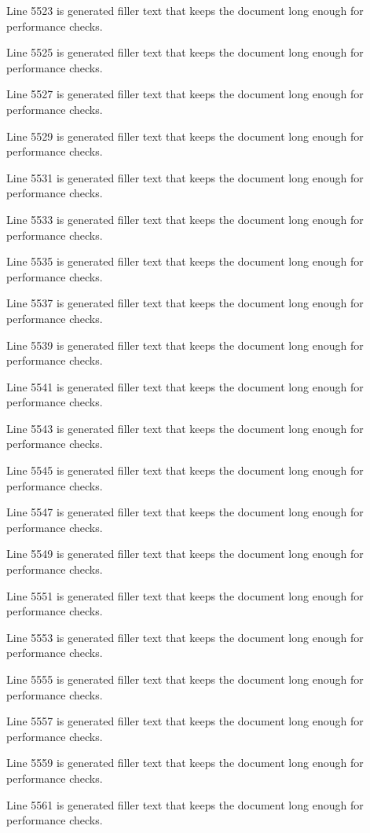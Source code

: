 Line 5523 is generated filler text that keeps the document long enough for performance checks.

Line 5525 is generated filler text that keeps the document long enough for performance checks.

Line 5527 is generated filler text that keeps the document long enough for performance checks.

Line 5529 is generated filler text that keeps the document long enough for performance checks.

Line 5531 is generated filler text that keeps the document long enough for performance checks.

Line 5533 is generated filler text that keeps the document long enough for performance checks.

Line 5535 is generated filler text that keeps the document long enough for performance checks.

Line 5537 is generated filler text that keeps the document long enough for performance checks.

Line 5539 is generated filler text that keeps the document long enough for performance checks.

Line 5541 is generated filler text that keeps the document long enough for performance checks.

Line 5543 is generated filler text that keeps the document long enough for performance checks.

Line 5545 is generated filler text that keeps the document long enough for performance checks.

Line 5547 is generated filler text that keeps the document long enough for performance checks.

Line 5549 is generated filler text that keeps the document long enough for performance checks.

Line 5551 is generated filler text that keeps the document long enough for performance checks.

Line 5553 is generated filler text that keeps the document long enough for performance checks.

Line 5555 is generated filler text that keeps the document long enough for performance checks.

Line 5557 is generated filler text that keeps the document long enough for performance checks.

Line 5559 is generated filler text that keeps the document long enough for performance checks.

Line 5561 is generated filler text that keeps the document long enough for performance checks.

